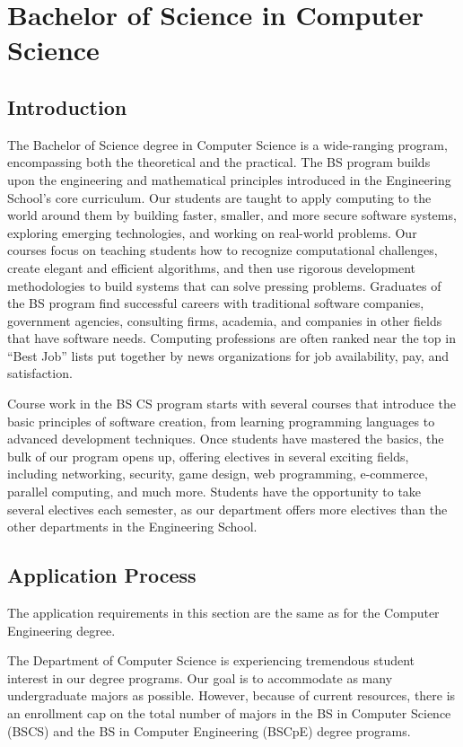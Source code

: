 \documentclass[10pt,letter]{book}
\newcommand{\mychapter}[2]{\chapter{#1}\renewcommand{\leftmark}{\textsc{#2}}}
\newcommand{\mysection}[1]{\section{#1}\renewcommand{\rightmark}{#1}}
\begin{document}
\clearpage
\mychapter{Bachelor of Science in Computer Science}{BS CS Degree}
\label{bscschapter}

\mysection{Introduction}


The Bachelor of Science degree in Computer Science is a wide-ranging
program, encompassing both the theoretical and the practical.  The BS
program builds upon the engineering and mathematical principles
introduced in the Engineering School's core curriculum.  Our students
are taught to apply computing to the world around them by building
faster, smaller, and more secure software systems, exploring emerging
technologies, and working on real-world problems.  Our courses focus
on teaching students how to recognize computational challenges, create
elegant and efficient algorithms, and then use rigorous development
methodologies to build systems that can solve pressing
problems. Graduates of the BS program find successful careers with
traditional software companies, government agencies, consulting firms,
academia, and companies in other fields that have software needs.
Computing professions are often ranked near the top in ``Best Job''
lists put together by news organizations for job availability, pay,
and satisfaction.

Course work in the BS CS program starts with several courses that
introduce the basic principles of software creation, from learning
programming languages to advanced development techniques.  Once
students have mastered the basics, the bulk of our program opens up,
offering electives in several exciting fields, including networking,
security, game design, web programming, e-commerce, parallel
computing, and much more.  Students have the opportunity to take
several electives each semester, as our department offers more
electives than the other departments in the Engineering School. 

\mysection{Application Process}
\label{bscsapplicationprocess}

The application requirements in this section are the same as for the
Computer Engineering degree.

The Department of Computer Science is experiencing tremendous student
interest in our degree programs. Our goal is to accommodate as many
undergraduate majors as possible. However, because of current
resources, there is an enrollment cap on the total number of
majors in the BS in Computer Science (BSCS) and the BS in Computer
Engineering (BSCpE) degree programs.
\end{document}
